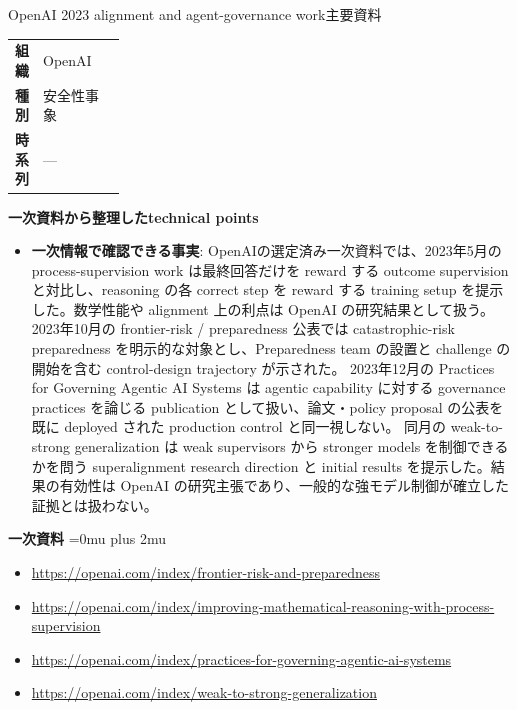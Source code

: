 \begin{technicalnote}{OpenAI 2023 alignment and agent-governance work}{主要資料}
\begingroup
\begin{tabularx}{\linewidth}{@{}>{\bfseries}p{0.22\linewidth}X@{}}
組織 & OpenAI \\
種別 & 安全性事象 \\
時系列 & — \\
\end{tabularx}
\smallskip
{\bfseries 一次資料から整理したtechnical points}
\begin{itemize}[leftmargin=1.5em,itemsep=0.35em]
\item \textbf{一次情報で確認できる事実}: OpenAIの選定済み一次資料では、2023年5月の process-supervision work は最終回答だけを reward する outcome supervision と対比し、reasoning の各 correct step を reward する training setup を提示した。数学性能や alignment 上の利点は OpenAI の研究結果として扱う。 2023年10月の frontier-risk / preparedness 公表では catastrophic-risk preparedness を明示的な対象とし、Preparedness team の設置と challenge の開始を含む control-design trajectory が示された。 2023年12月の Practices for Governing Agentic AI Systems は agentic capability に対する governance practices を論じる publication として扱い、論文・policy proposal の公表を既に deployed された production control と同一視しない。 同月の weak-to-strong generalization は weak supervisors から stronger models を制御できるかを問う superalignment research direction と initial results を提示した。結果の有効性は OpenAI の研究主張であり、一般的な強モデル制御が確立した証拠とは扱わない。
\end{itemize}
\begin{minipage}{\linewidth}
\begin{samepage}
{\bfseries 一次資料}
\begingroup\sloppy
\Urlmuskip=0mu plus 2mu\relax
\begin{itemize}[leftmargin=1.5em,itemsep=0.25em]
\item {\scriptsize\url{https://openai.com/index/frontier-risk-and-preparedness}}
\item {\scriptsize\url{https://openai.com/index/improving-mathematical-reasoning-with-process-supervision}}
\item {\scriptsize\url{https://openai.com/index/practices-for-governing-agentic-ai-systems}}
\item {\scriptsize\url{https://openai.com/index/weak-to-strong-generalization}}
\end{itemize}
\endgroup
\end{samepage}
\end{minipage}
\endgroup
\end{technicalnote}
\medskip

